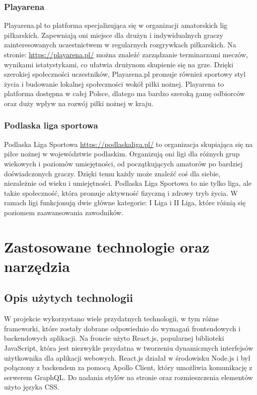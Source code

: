 \documentclass[wmii,inf,inz]{uwmthesis} %
\begin{document}
\subsection{Playarena} 
Playarena.pl to platforma specjalizująca się w organizacji amatorskich lig piłkarskich. Zapewniają oni miejsce dla drużyn i indywidualnych
graczy zainteresowanych uczestnictwem w regularnych rozgrywkach piłkarskich. Na stronie:  \url{https://playarena.pl/}  można znaleźć zarządzanie terminarzami meczów, wynikami istatystykami, co ułatwia drużynom skupienie się na grze. Dzięki szerokiej społeczności uczestników, Playarena.pl promuje również sportowy styl życia
i budowanie lokalnej społeczności wokół piłki nożnej. Playarena to platforma dostępna w całej Polsce, dlatego ma bardzo szeroką gamę odbiorców oraz duży wpływ na rozwój piłki nożnej w kraju.
\subsection{Podlaska liga sportowa}
Podlaska Liga Sportowa \url{https://podlaskaliga.pl/} to organizacja skupiająca się na piłce nożnej w województwie podlaskim.  Organizują oni ligi dla różnych grup wiekowych i poziomów umiejętności, od początkujących amatorów po bardziej doświadczonych graczy.  Dzięki temu każdy może znaleźć coś dla siebie, niezależnie od wieku i umiejętności.  Podlaska Liga Sportowa to nie tylko liga, ale także społeczność, która promuje aktywność fizyczną i zdrowy tryb życia.  W ramach ligi funkcjonują dwie główne kategorie: I Liga i II Liga, które różnią się poziomem zaawansowania zawodników.

\chapter{Zastosowane technologie oraz narzędzia}
\section{Opis użytych technologii}
W projekcie wykorzystano wiele przydatnych technologii, w tym różne frameworki, które zostały dobrane odpowiednio do wymagań frontendowych i backendowych aplikacji. Na froncie użyto React.js, popularnej biblioteki JavaScript, która jest niezwykle przydatna w tworzeniu dynamicznych interfejsów użytkownika dla aplikacji webowych. React.js działał w środowisku Node.js i był połączony z backendem za pomocą Apollo Client, który umożliwia komunikację z serwerem GraphQL. Do nadania stylów na stronie oraz rozmieszczenia elementów użyto języka CSS.
\end{document}
